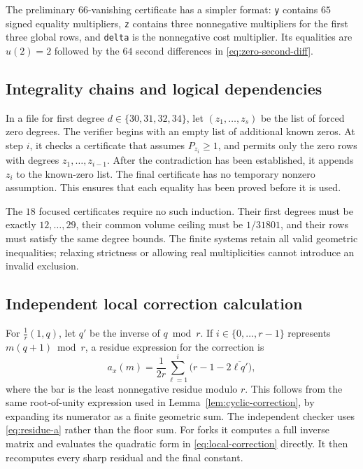 \documentclass[12pt,a4paper]{article}
\numberwithin{equation}{section}
\theoremstyle{definition}
\begin{document}
The preliminary \(66\)-vanishing certificate has a simpler format:
\texttt{y} contains \(65\) signed equality multipliers,
\texttt{z} contains three nonnegative multipliers for the first three
global rows, and \texttt{delta} is the nonnegative cost multiplier.
Its equalities are \(u(2)=2\) followed by the \(64\) second differences
in \eqref{eq:zero-second-diff}.

\subsection{Integrality chains and logical dependencies}

In a file for first degree \(d\in\{30,31,32,34\}\), let
\((z_1,\ldots,z_s)\) be the list of forced zero degrees.
The verifier begins with an empty list of additional known zeros.
At step \(i\), it checks a certificate that assumes
\(P_{z_i}\geq1\), and permits only the zero rows with
degrees \(z_1,\ldots,z_{i-1}\).
After the contradiction has been established, it appends \(z_i\)
to the known-zero list.
The final certificate has no temporary nonzero assumption.
This ensures that each equality has been proved before it is used.

The \(18\) focused certificates require no such induction.
Their first degrees must be exactly \(12,\ldots,29\), their common
volume ceiling must be \(1/31801\), and their rows must satisfy the
same degree bounds. The finite systems retain all valid geometric
inequalities; relaxing strictness or allowing real multiplicities
cannot introduce an invalid exclusion.

\subsection{Independent local correction calculation}

For \(\frac1r(1,q)\), let \(q'\) be the inverse of \(q\bmod r\).
If \(i\in\{0,\ldots,r-1\}\) represents \(m(q+1)\bmod r\), a residue
expression for the correction is
\begin{equation}\label{eq:residue-a}
        a_x(m)=\frac1{2r}\sum_{\ell=1}^i
                       \bigl(r-1-2\overline{\ell q'}\bigr),
\end{equation}
where the bar is the least nonnegative residue modulo \(r\).
This follows from the same root-of-unity expression used in
Lemma~\ref{lem:cyclic-correction}, by expanding its numerator as
a finite geometric sum.
The independent checker uses \eqref{eq:residue-a} rather than the
floor sum. For forks it computes a full inverse matrix and evaluates
the quadratic form in \eqref{eq:local-correction} directly.
It then recomputes every sharp residual and the final constant.
\end{document}
